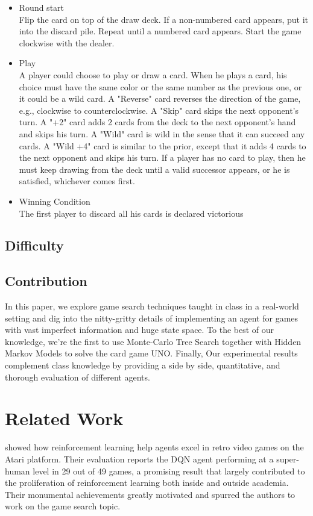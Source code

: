 \documentclass{article}
\begin{document}
\begin{itemize}
    \item Round start \\
        Flip the card on top of the draw deck. If a non-numbered card appears, put it into the discard pile. Repeat until a numbered card appears. Start the game clockwise with the dealer.
    \item Play \\
        A player could choose to play or draw a card. When he plays a card, his choice must have the same color or the same number as the previous one, or it could be a wild card. A "Reverse" card reverses the direction of the game, e.g., clockwise to counterclockwise. A "Skip" card skips the next opponent's turn. A "+2" card adds 2 cards from the deck to the next opponent's hand and skips his turn.  A "Wild" card is wild in the sense that it can succeed any cards. A "Wild +4" card is similar to the prior, except that it adds 4 cards to the next opponent and skips his turn. If a player has no card to play, then he must keep drawing from the deck until a valid successor appears, or he is satisfied, whichever comes first.
    \item Winning Condition \\
        The first player to discard all his cards is declared victorious
\end{itemize}

\subsection{Difficulty}
\todo{}
\subsection{Contribution}
In this paper, we explore game search techniques taught in class in a real-world setting and dig into the nitty-gritty details of implementing an agent for games with vast imperfect information and huge state space. To the best of our knowledge, we're the first to use Monte-Carlo Tree Search together with Hidden Markov Models to solve the card game UNO. Finally, Our experimental results complement class knowledge by providing a side by side, quantitative, and thorough evaluation of different agents. 


\section{Related Work}
\citeauthor{mnih2015human} showed how reinforcement learning help agents excel in retro video games on the Atari platform. Their evaluation reports the DQN agent performing at a super-human level in 29 out of 49 games, a promising result that largely contributed to the proliferation of reinforcement learning both inside and outside academia. Their monumental achievements greatly motivated and spurred the authors to work on the game search topic. 
\end{document}
